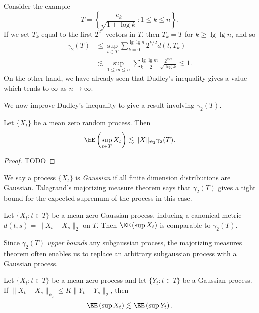 \begin{example}
	Consider the example
	\[ T = \left\{ \frac{e_k}{\sqrt{1 + \log k}} : 1 \leq k \leq n \right\}. \]
	If we set $T_k$ equal to the first $2^{2^k}$ vectors in $T$, then $T_k = T$ for $k \geq \lg \lg n$, and so
	\begin{align*}
		\gamma_2(T) &\leq \sup_{t \in T} \sum_{k = 0}^{\lg \lg n} 2^{k/2} d(t,T_k)\\
		&\lesssim \sup_{1 \leq m \leq n} \sum_{k = 2}^{\lg \lg m} \frac{2^{k/2}}{\sqrt{\log k}} \lesssim 1.
	\end{align*}
	On the other hand, we have already seen that Dudley's inequality gives a value which tends to $\infty$ as $n \to \infty$.
\end{example}

We now improve Dudley's inequality to give a result involving $\gamma_2(T)$.

\begin{theorem}
	Let $\{ X_t \}$ be a mean zero random process. Then
	\[ \EE \left( \sup_{t \in T} X_t \right) \lesssim \| X \|_{\psi_2} \gamma_2(T). \]
\end{theorem}
\begin{proof}
	TODO
\end{proof}

We say a process $\{ X_t \}$ is {\it Gaussian} if all finite dimension distributions are Gaussian. Talagrand's majorizing measure theorem says that $\gamma_2(T)$ gives a tight bound for the expected supremum of the process in this case.

\begin{theorem}
	Let $\{ X_t : t \in T \}$ be a mean zero Gaussian process, inducing a canonical metric $d(t,s) = \| X_t - X_s \|_2$ on $T$. Then $\EE \left( \sup X_t \right)$ is comparable to $\gamma_2(T)$.
\end{theorem}

Since $\gamma_2(T)$ {\it upper bounds} any subgaussian process, the majorizing measures theorem often enables us to replace an arbitrary subgaussian process with a Gaussian process.

\begin{corollary}
	Let $\{ X_t : t \in T \}$ be a mean zero process and let $\{ Y_t : t \in T \}$ be a Gaussian process. If $\| X_t - X_s \|_{\psi_2} \leq K \| Y_t - Y_s \|_2$, then
	\[ \EE \left( \sup X_t \right) \lesssim \EE \left( \sup Y_t \right). \]
\end{corollary}

